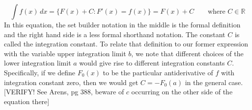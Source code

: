 \begin{equation}
 \int f(x) \, dx = 	\{ F(x) + C : F'(x) = f(x) \} = F(x) + C \qquad \text{where } C \in \mathbb{R}
\end{equation}
In this equation, the set builder notation in the middle is the formal definition and the right hand side is a less formal shorthand notation. The constant $C$ is called the integration constant. To relate that definition to our former expression with the variable upper integration limit $b$, we note that different choices of the lower integration limit $a$ would give rise to different integration constants $C$. Specifically, if we define $F_0(x)$ to be the particular antiderivative of $f$ with integration constant zero, then we would get $C = -F_0(a)$ in the general case. [VERIFY! See Arens, pg 388, beware of $c$ occurring on the other side of the equation there]






